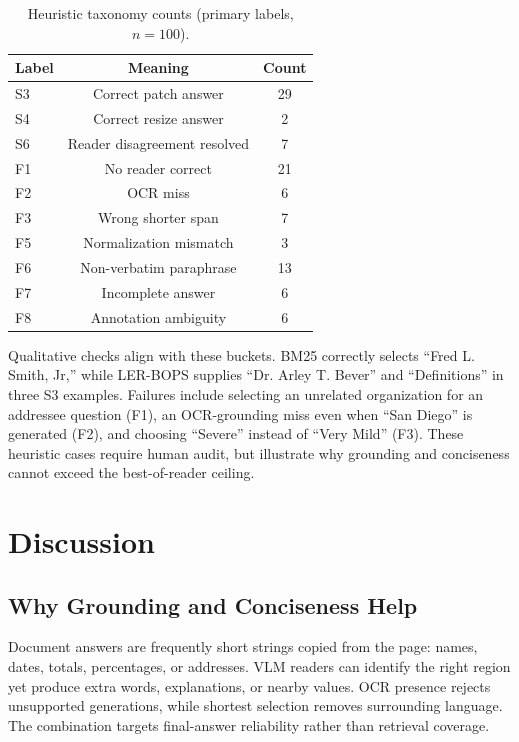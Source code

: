 \documentclass[journal]{IEEEtran}
\begin{document}
\begin{table}[t]
\centering
\caption{Heuristic taxonomy counts (primary labels, $n=100$).}
\label{tab:taxonomy}
\begin{tabular}{lcc}
\toprule
Label & Meaning & Count\\
\midrule
S3 & Correct patch answer & 29\\
S4 & Correct resize answer & 2\\
S6 & Reader disagreement resolved & 7\\
F1 & No reader correct & 21\\
F2 & OCR miss & 6\\
F3 & Wrong shorter span & 7\\
F5 & Normalization mismatch & 3\\
F6 & Non-verbatim paraphrase & 13\\
F7 & Incomplete answer & 6\\
F8 & Annotation ambiguity & 6\\
\bottomrule
\end{tabular}
\end{table}

Qualitative checks align with these buckets.  BM25 correctly selects
``Fred L. Smith, Jr,'' while LER-BOPS supplies ``Dr. Arley T. Bever'' and
``Definitions'' in three S3 examples.  Failures include selecting an unrelated
organization for an addressee question (F1), an OCR-grounding miss even when
``San Diego'' is generated (F2), and choosing ``Severe'' instead of ``Very
Mild'' (F3).  These heuristic cases require human audit, but illustrate why
grounding and conciseness cannot exceed the best-of-reader ceiling.

\section{Discussion}
\subsection{Why Grounding and Conciseness Help}
Document answers are frequently short strings copied from the page: names,
dates, totals, percentages, or addresses.  VLM readers can identify the right
region yet produce extra words, explanations, or nearby values.  OCR presence
rejects unsupported generations, while shortest selection removes surrounding
language.  The combination targets final-answer reliability rather than
retrieval coverage.
\end{document}
